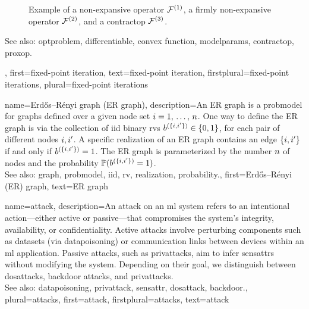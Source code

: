{{\begin{figure}[H]
\begin{center}
			\end{center} 
			\caption{Example of a non-expansive operator $\mathcal{F}^{(1)}$, a firmly non-expansive operator $\mathcal{F}^{(2)}$, and 
				a \gls{contractop} $\mathcal{F}^{(3)}$. \label{fig_examples_nonexp_dict}}
		\end{figure} 
		See also: \gls{optproblem}, \gls{differentiable}, \gls{convex} \gls{function}, \gls{modelparams}, \gls{contractop}, \gls{proxop}.},
	first={fixed-point iteration},
	text={fixed-point iteration},
	firstplural={fixed-point iterations}, 
	plural={fixed-point iterations}
}


{name={Erd\H{o}s–R\'enyi graph (ER graph)},
	description={An ER \gls{graph} is a \gls{probmodel} for \glspl{graph} defined over 
		a given node set $i=1, \,\ldots, \,n$. One way to define the ER \gls{graph} is 
		via the collection of \gls{iid} binary \glspl{rv} $b^{(\{i,i'\})} \in \{0,1\}$, 
		for each pair of different nodes $i, i'$. A specific \gls{realization}  
		of an ER \gls{graph} contains an edge $\{i,i'\}$ if and only if 
		$b^{(\{i,i'\})}=1$. The ER \gls{graph} is parameterized by the 
		number $n$ of nodes and the \gls{probability} $\mathbb{P}({b^{(\{i,i'\})}=1})$. 
		\\
		See also: \gls{graph}, \gls{probmodel}, \gls{iid}, \gls{rv}, \gls{realization}, \gls{probability}.},
	first={Erd\H{o}s–R\'enyi (ER) graph},
	text={ER graph}
}

{name={attack},  
	description={An attack on an \gls{ml} system refers to an intentional action—either 
		active or passive—that compromises the system's integrity, availability, or confidentiality. 
		Active attacks involve perturbing components such as \glspl{dataset} (via \gls{datapoisoning}) 
		or communication links between \glspl{device} within an \gls{ml} application. Passive attacks, 
		such as \glspl{privattack}, aim to infer \glspl{sensattr} without modifying the system. 
		Depending on their goal, we distinguish between \glspl{dosattack}, \gls{backdoor} attacks, and \glspl{privattack}.
		\\
		See also: \gls{datapoisoning}, \gls{privattack}, \gls{sensattr}, \gls{dosattack}, \gls{backdoor}.},
	plural={attacks}, 
	first={attack},
	firstplural={attacks},
	text={attack}
}

